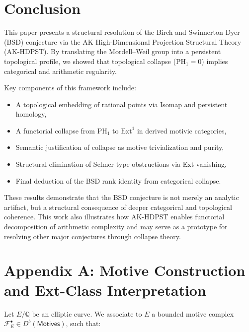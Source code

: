 \documentclass[11pt]{article}
\theoremstyle{definition}
\begin{document}
\section{Conclusion}

This paper presents a structural resolution of the Birch and Swinnerton-Dyer (BSD) conjecture via  
the AK High-Dimensional Projection Structural Theory (AK-HDPST).  
By translating the Mordell--Weil group into a persistent topological profile,  
we showed that topological collapse (\( \mathrm{PH}_1 = 0 \)) implies categorical and arithmetic regularity.

\bigskip

Key components of this framework include:

\begin{itemize}
  \item A topological embedding of rational points via Isomap and persistent homology,
  \item A functorial collapse from \( \mathrm{PH}_1 \) to \( \mathrm{Ext}^1 \) in derived motivic categories,
  \item Semantic justification of collapse as motive trivialization and purity,
  \item Structural elimination of Selmer-type obstructions via Ext vanishing,
  \item Final deduction of the BSD rank identity from categorical collapse.
\end{itemize}

\bigskip

These results demonstrate that the BSD conjecture is not merely an analytic artifact,  
but a structural consequence of deeper categorical and topological coherence.  
This work also illustrates how AK-HDPST enables functorial decomposition of arithmetic complexity  
and may serve as a prototype for resolving other major conjectures through collapse theory.




\section*{Appendix A: Motive Construction and Ext-Class Interpretation}

Let \( E/\mathbb{Q} \) be an elliptic curve.  
We associate to \( E \) a bounded motive complex \( \mathcal{F}_E^\bullet \in D^b(\mathsf{Motives}) \), such that:
\end{document}
